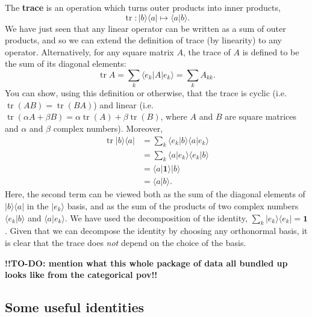\documentclass[fleqn]{article}
\begin{document}
The \textbf{trace} is an operation which turns outer products into inner products,
\[
  \operatorname{tr}\colon |b\rangle\langle a| \longmapsto \langle a|b\rangle.
\]
We have just seen that any linear operator can be written as a sum of outer products, and so we can extend the definition of trace (by linearity) to any operator.
Alternatively, for any square matrix \(A\), the trace of \(A\) is defined to be the sum of its diagonal elements:
\[
  \operatorname{tr}A = \sum_k \langle e_k|A|e_k\rangle = \sum_k A_{kk}.
\]
You can show, using this definition or otherwise, that the trace is cyclic (i.e.~\(\operatorname{tr}(AB) = \operatorname{tr}(BA)\)) and linear (i.e.~\(\operatorname{tr}(\alpha A+\beta B) = \alpha\operatorname{tr}(A)+\beta\operatorname{tr}(B)\), where \(A\) and \(B\) are square matrices and \(\alpha\) and \(\beta\) complex numbers).
Moreover,
\[
  \begin{aligned}
    \operatorname{tr}|b\rangle\langle a|
    &= \sum_k \langle e_k|b\rangle\langle a|e_k\rangle
  \\&= \sum_k \langle a|e_k\rangle\langle e_k|b\rangle
  \\&= \langle a|\mathbf{1}\rangle|b\rangle
  \\&= \langle a|b\rangle.
  \end{aligned}
\]
Here, the second term can be viewed both as the sum of the diagonal elements of \(|b\rangle\langle a|\) in the \(|e_k\rangle\) basis, and as the sum of the products of two complex numbers \(\langle e_k|b\rangle\) and \(\langle a|e_k\rangle\).
We have used the decomposition of the identity, \(\sum_k|e_k\rangle\langle e_k|=\mathbf{1}\).
Given that we can decompose the identity by choosing any orthonormal basis, it is clear that the trace does \emph{not} depend on the choice of the basis.

\textbf{!!TO-DO: mention what this whole package of data all bundled up looks like from the categorical pov!!}

\hypertarget{some-useful-identities}{%
\subsection{Some useful identities}\label{some-useful-identities}}
\end{document}
